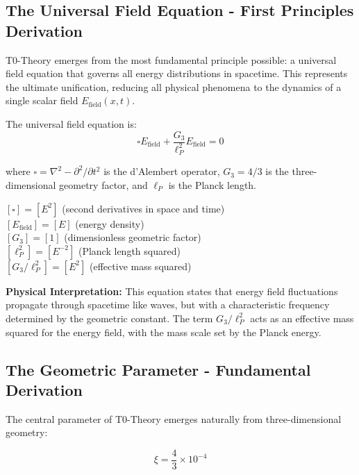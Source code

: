 \documentclass[12pt,a4paper]{article}
\theoremstyle{definition}
\begin{document}
\subsection{The Universal Field Equation - First Principles Derivation}

T0-Theory emerges from the most fundamental principle possible: a universal field equation that governs all energy distributions in spacetime. This represents the ultimate unification, reducing all physical phenomena to the dynamics of a single scalar field $E_{\text{field}}(x,t)$.

The universal field equation is:
\begin{equation}
	\boxed{\square E_{\text{field}} + \frac{G_3}{\ell_P^2} E_{\text{field}} = 0}
\end{equation}

where $\square = \nabla^2 - \partial^2/\partial t^2$ is the d'Alembert operator, $G_3 = 4/3$ is the three-dimensional geometry factor, and $\ell_P$ is the Planck length.

\begin{einheitencheck}
	$[\square] = [E^2]$ (second derivatives in space and time) \checkmark\\
	$[E_{\text{field}}] = [E]$ (energy density) \checkmark\\
	$[G_3] = [1]$ (dimensionless geometric factor) \checkmark\\
	$[\ell_P^2] = [E^{-2}]$ (Planck length squared) \checkmark\\
	$[G_3/\ell_P^2] = [E^2]$ (effective mass squared) \checkmark
\end{einheitencheck}

\textbf{Physical Interpretation:} This equation states that energy field fluctuations propagate through spacetime like waves, but with a characteristic frequency determined by the geometric constant. The term $G_3/\ell_P^2$ acts as an effective mass squared for the energy field, with the mass scale set by the Planck energy.

\subsection{The Geometric Parameter - Fundamental Derivation}

The central parameter of T0-Theory emerges naturally from three-dimensional geometry:

\begin{equation}
	\boxed{\xi = \frac{4}{3} \times 10^{-4}}
\end{equation}
\end{document}

